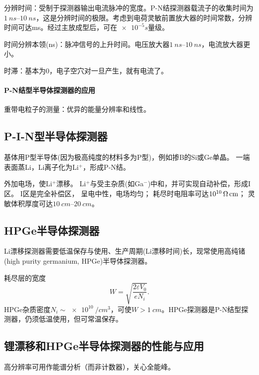 \begin{compactitem}
	\item 分辨时间：受制于探测器输出电流脉冲的宽度。P-N结探测器载流子的收集时间为$\SIrange{1}{10}{ns}$，这是分辨时间的极限。考虑到电荷灵敏前置放大器的时间常数，分辨时间可达ms。经过主放成型后，可在$\SI{e-5}s$量级。
	\item 时间分辨本领(ns)：脉冲信号的上升时间。电压放大器$\SIrange{1}{10}{ns}$，电流放大器更小。
	\item 时滞：基本为0，电子空穴对一旦产生，就有电流了。
\end{compactitem}
\iffalse
\begin{compactenum}
	\item 
\end{compactenum}
\begin{compactitem}
	\item 
\end{compactitem}
\fi

\paragraph{P-N结型半导体探测器的应用}
重带电粒子的测量：优异的能量分辨率和线性。
\subsection{P-I-N型半导体探测器}
基体用P型半导体(因为极高纯度的材料多为P型)，例如掺B的Si或Ge单晶。
一端表面蒸Li，Li离子化为Li$^+$，形成P-N结。

外加电场，使Li$^+$漂移。
Li$^+$与受主杂质(如Ga$^-$)中和，并可实现自动补偿，形成I区。
I区是完全补偿区，
呈电中性，电场均匀；
耗尽时电阻率可达$\SI{E10}{\ohm.cm}$；
灵敏体积厚度可达$\SIrange{10}{20}{cm}$。
\subsection{HPGe半导体探测器}
Li漂移探测器需要低温保存与使用、生产周期(Li漂移时间)长，现常使用高纯锗(high purity germanium, HPGe)半导体探测器。%

耗尽层的宽度
\[
	W=\sqrt{\frac{2\varepsilon V_0}{eN_i}}.
\]
HPGe杂质密度$N_i\sim\SI{e10}{/cm^3}$，可使$W>\SI{1}{cm}$。HPGe探测器是P-N结型探测器，仍须低温使用，但可常温保存。
\subsection{锂漂移和HPGe半导体探测器的性能与应用}
高分辨率可用作能谱分析（而非计数器），关心全能峰。

